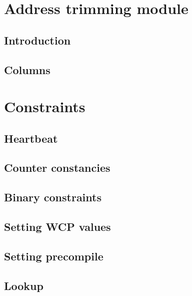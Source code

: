 
\section{Address trimming module}
\subsection{Introduction}               
\subsection{Columns}                    

\section{Constraints}
\subsection{Heartbeat}                  \label{sec: heartbeat} 
\subsection{Counter constancies}        
\subsection{Binary constraints}         
\subsection{Setting WCP values}         
\subsection{Setting precompile}         
\subsection{Lookup}                     
